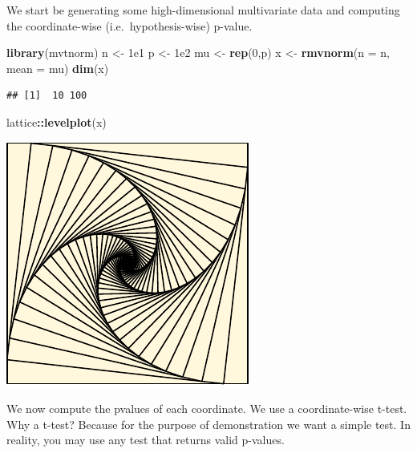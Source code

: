 \documentclass[]{book}
\newenvironment{Shaded}{\begin{snugshade}}{\end{snugshade}}
\newcommand{\ControlFlowTok}[1]{\textcolor[rgb]{0.13,0.29,0.53}{\textbf{#1}}}
\newcommand{\DataTypeTok}[1]{\textcolor[rgb]{0.13,0.29,0.53}{#1}}
\newcommand{\DecValTok}[1]{\textcolor[rgb]{0.00,0.00,0.81}{#1}}
\newcommand{\FloatTok}[1]{\textcolor[rgb]{0.00,0.00,0.81}{#1}}
\newcommand{\KeywordTok}[1]{\textcolor[rgb]{0.13,0.29,0.53}{\textbf{#1}}}
\newcommand{\NormalTok}[1]{#1}
\newcommand{\OperatorTok}[1]{\textcolor[rgb]{0.81,0.36,0.00}{\textbf{#1}}}
\newcommand{\StringTok}[1]{\textcolor[rgb]{0.31,0.60,0.02}{#1}}
\theoremstyle{definition}
\theoremstyle{definition}
\theoremstyle{definition}
\theoremstyle{remark}
\begin{document}
We start be generating some high-dimensional multivariate data and computing the coordinate-wise (i.e.~hypothesis-wise) p-value.

\begin{Shaded}
\begin{Highlighting}[]
\KeywordTok{library}\NormalTok{(mvtnorm)}
\NormalTok{n <-}\StringTok{ }\FloatTok{1e1}
\NormalTok{p <-}\StringTok{ }\FloatTok{1e2}
\NormalTok{mu <-}\StringTok{ }\KeywordTok{rep}\NormalTok{(}\DecValTok{0}\NormalTok{,p)}
\NormalTok{x <-}\StringTok{ }\KeywordTok{rmvnorm}\NormalTok{(}\DataTypeTok{n =}\NormalTok{ n, }\DataTypeTok{mean =}\NormalTok{ mu)}
\KeywordTok{dim}\NormalTok{(x)}
\end{Highlighting}
\end{Shaded}

\begin{verbatim}
## [1]  10 100
\end{verbatim}

\begin{Shaded}
\begin{Highlighting}[]
\NormalTok{lattice}\OperatorTok{::}\KeywordTok{levelplot}\NormalTok{(x)}
\end{Highlighting}
\end{Shaded}

\includegraphics[width=0.5\linewidth]{Rcourse_files/figure-latex/unnamed-chunk-217-1}

We now compute the pvalues of each coordinate.
We use a coordinate-wise t-test.
Why a t-test? Because for the purpose of demonstration we want a simple test. In reality, you may use any test that returns valid p-values.

\begin{Shaded}
\end{Shaded}
\end{document}
